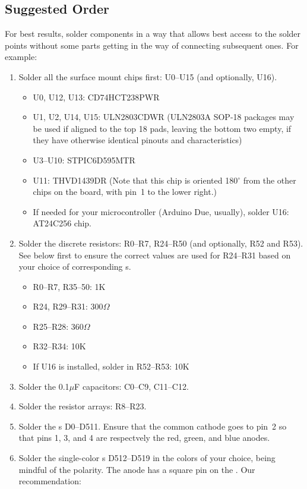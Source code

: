 \subsection{Suggested Order}
For best results, solder components in a way that allows best access to the solder points without some parts getting
in the way of connecting subsequent ones. For example:

\begin{enumerate}
	\item Solder all the surface mount chips first: U0--U15 (and optionally, U16).
		\begin{itemize}
			\item U0, U12, U13: CD74HCT238PWR
			\item U1, U2, U14, U15: ULN2803CDWR (ULN2803A SOP-18 packages may be used if aligned to the top 18 pads, leaving the bottom two empty, if they have otherwise identical pinouts and characteristics)
			\item U3--U10: STPIC6D595MTR
			\item U11: THVD1439DR (Note that this chip is oriented 180$^{\circ}$ from the other chips on the board, with pin~1 to the lower right.)
			\item If needed for your microcontroller (Arduino Due, usually), solder U16: AT24C256  chip.
		\end{itemize}
	\item Solder the discrete resistors: R0--R7, R24--R50 (and optionally, R52 and R53). See below first to ensure the correct values are used
		for R24--R31 based on your choice of corresponding s.
		\begin{itemize}
			\item R0--R7, R35--50: 1K
			\item R24, R29--R31: 300$\Omega$
			\item R25--R28: 360$\Omega$
			\item R32--R34: 10K
			\item If U16 is installed, solder in R52--R53: 10K
		\end{itemize}
	\item Solder the 0.1$\mu$F capacitors: C0--C9, C11--C12.
	\item Solder the resistor arrays: R8--R23.
	\item Solder the  s D0--D511. Ensure that the common cathode goes to pin~2 so that pins 1, 3, and 4
		are respectvely the red, green, and blue anodes.
	\item Solder the single-color s D512--D519 in the colors of your choice, being mindful of the polarity. The anode has a square pin on the . Our recommendation:

\end{enumerate}
